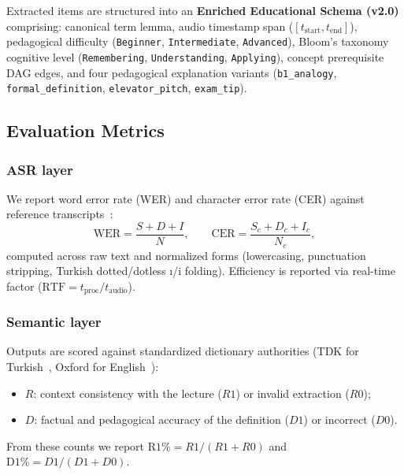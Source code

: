 \documentclass[conference]{IEEEtran}
\begin{document}
Extracted items are structured into an \textbf{Enriched Educational Schema (v2.0)} comprising: canonical term lemma, audio timestamp span ($[t_{\text{start}}, t_{\text{end}}]$), pedagogical difficulty (\texttt{Beginner}, \texttt{Intermediate}, \texttt{Advanced}), Bloom's taxonomy cognitive level (\texttt{Remembering}, \texttt{Understanding}, \texttt{Applying}), concept prerequisite DAG edges, and four pedagogical explanation variants (\texttt{b1\_analogy}, \texttt{formal\_definition}, \texttt{elevator\_pitch}, \texttt{exam\_tip}).

\subsection{Evaluation Metrics}
\label{sec:metrics}

\subsubsection{ASR layer}
We report word error rate (WER) and character error rate (CER) against reference transcripts~\cite{jurafsky2026}:
\begin{equation}
\mathrm{WER}=\frac{S+D+I}{N}, \qquad \mathrm{CER}=\frac{S_c+D_c+I_c}{N_c},
\label{eq:wer}
\end{equation}
computed across raw text and normalized forms (lowercasing, punctuation stripping, Turkish dotted/dotless \i{}/i folding). Efficiency is reported via real-time factor ($\mathrm{RTF} = t_{\mathrm{proc}} / t_{\mathrm{audio}}$).

\subsubsection{Semantic layer}
Outputs are scored against standardized dictionary authorities (TDK for Turkish~\cite{tdk2026}, Oxford for English~\cite{oed2026}):
\begin{itemize}
\item $R$: context consistency with the lecture ($R1$) or invalid extraction ($R0$);
\item $D$: factual and pedagogical accuracy of the definition ($D1$) or incorrect ($D0$).
\end{itemize}
From these counts we report $\mathrm{R1\%} = R1/(R1+R0)$ and $\mathrm{D1\%} = D1/(D1+D0)$. 
\end{document}
